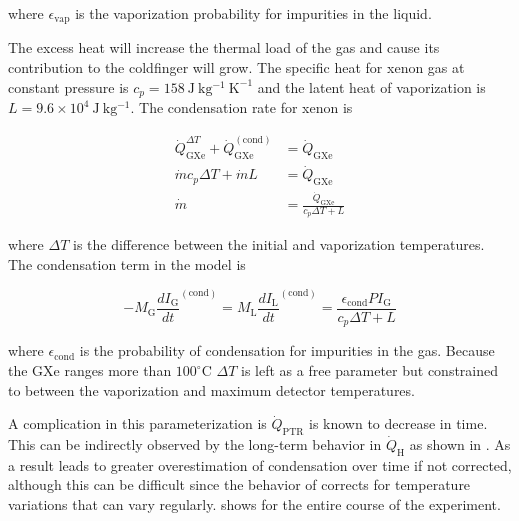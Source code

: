 \noindent where $\epsilon_{\mathrm{vap}}$ is the vaporization probability for impurities in the liquid.

The excess heat will increase the thermal load of the gas and cause its contribution to the coldfinger will grow.  The specific heat for
xenon gas at constant pressure is $c_p = 158\ \mathrm{J\ kg^{-1}\ K^{-1}}$ and the latent heat of vaporization is
$L = 9.6 \times 10^4\ \mathrm{J\ kg^{-1}}$.  The condensation rate for xenon is

\begin{equation}
\begin{aligned}
\dot{Q}_{\mathrm{GXe}}^{\Delta T} + \dot{Q}_{\mathrm{GXe}}^{(\mathrm{cond})} &= \dot{Q}_{\mathrm{GXe}} \\
\dot{m} c_p \Delta T + \dot{m} L &= \dot{Q}_{\mathrm{GXe}} \\
\dot{m} &= \frac{\dot{Q}_{\mathrm{GXe}}}{c_p \Delta T + L}
\end{aligned}
\end{equation}

\noindent where $\Delta T$ is the difference between the initial and vaporization temperatures.  The condensation term in the model is

\begin{equation}
-M_{\mathrm{G}} \frac{dI_{\mathrm{G}}}{dt}^{(\mathrm{cond})} = M_{\mathrm{L}} \frac{dI_{\mathrm{L}}}{dt}^{(\mathrm{cond})} =
\frac{\epsilon_{\mathrm{cond}} P I_{\mathrm{G}}}{c_p \Delta T + L}
\end{equation}

\noindent where $\epsilon_{\mathrm{cond}}$ is the probability of condensation for impurities in the gas.  Because the GXe ranges more
than $100^{\circ}\mathrm{C}$ $\Delta T$ is left as a free parameter but constrained to between the vaporization and maximum detector
temperatures.

A complication in this parameterization is $\dot{Q}_{\mathrm{PTR}}$ is known to decrease in time.  This can be indirectly observed by
the long-term behavior in $\dot{Q}_{\mathrm{H}}$ as shown in .  As a result
 leads to greater overestimation of condensation over time if not
corrected, although this can be difficult since the behavior of \qdh corrects for temperature variations that can vary
regularly.   shows \qdh for the entire course of the experiment.

